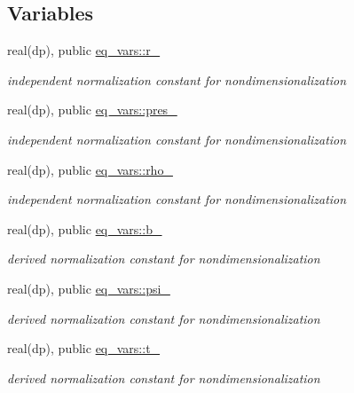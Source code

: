 \subsection*{Variables}
\begin{DoxyCompactItemize}
\item 
real(dp), public \hyperlink{namespaceeq__vars_a0c1f124ab3260a0f6937df9189a18184}{eq\+\_\+vars\+::r\+\_}
\begin{DoxyCompactList}\small\item\em independent normalization constant for nondimensionalization \end{DoxyCompactList}\item 
real(dp), public \hyperlink{namespaceeq__vars_abce8bbe23c333a591a2ee5cef9512de9}{eq\+\_\+vars\+::pres\+\_}
\begin{DoxyCompactList}\small\item\em independent normalization constant for nondimensionalization \end{DoxyCompactList}\item 
real(dp), public \hyperlink{namespaceeq__vars_a8c9bdb18a418329b9be241342ea704e3}{eq\+\_\+vars\+::rho\+\_}
\begin{DoxyCompactList}\small\item\em independent normalization constant for nondimensionalization \end{DoxyCompactList}\item 
real(dp), public \hyperlink{namespaceeq__vars_acdd2464f2282359a818e4159b502e84b}{eq\+\_\+vars\+::b\+\_}
\begin{DoxyCompactList}\small\item\em derived normalization constant for nondimensionalization \end{DoxyCompactList}\item 
real(dp), public \hyperlink{namespaceeq__vars_a2bb2594492faa83869c3eaf8cabe521e}{eq\+\_\+vars\+::psi\+\_}
\begin{DoxyCompactList}\small\item\em derived normalization constant for nondimensionalization \end{DoxyCompactList}\item 
real(dp), public \hyperlink{namespaceeq__vars_a5170d0b84bb0faf24d5fdcf7c9371620}{eq\+\_\+vars\+::t\+\_}
\begin{DoxyCompactList}\small\item\em derived normalization constant for nondimensionalization \end{DoxyCompactList}\item 

\end{DoxyCompactItemize}
